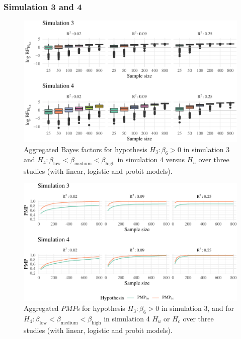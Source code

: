 \documentclass[review, 3p, authoryear]{elsarticle} %
\begin{document}
\hypertarget{simulation-3-and-4}{%
\subsubsection{Simulation 3 and 4}\label{simulation-3-and-4}}

\begin{figure}
\includegraphics[width=1\linewidth]{manuscript_volker_files/figure-latex/BF34-1} \caption{Aggregated Bayes factors for hypothesis $H_3: \beta_6 > 0$ in simulation 3 and $H_4: \beta_{\text{low}} < \beta_{\text{medium}} < \beta_{\text{high}}$ in simulation 4 versus $H_u$ over three studies (with linear, logistic and probit models).}\label{fig:BF34}
\end{figure}

\begin{figure}
\includegraphics[width=1\linewidth]{manuscript_volker_files/figure-latex/PMP34-1} \caption{Aggregated $PMP$s for hypothesis $H_3: \beta_6 > 0$ in simulation 3, and for $H_4: \beta_{\text{low}} < \beta_{\text{medium}} < \beta_{\text{high}}$ in simulation 4 $H_u$ or $H_c$ over three studies (with linear, logistic and probit models).}\label{fig:PMP34}
\end{figure}
\end{document}
